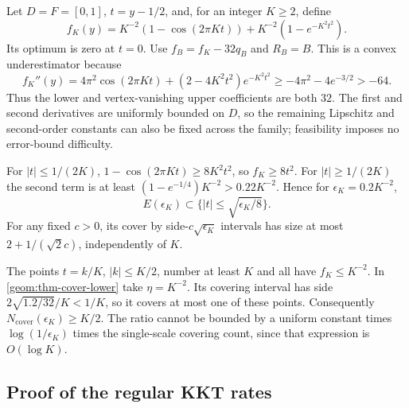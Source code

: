 \begin{example}\label{app:geometry:ex-wells}
Let $D=F=[0,1]$, $t=y-1/2$, and, for an integer $K\geq2$, define
\[
 f_K(y)=K^{-2}(1-\cos(2\pi Kt))
                  +K^{-2}(1-e^{-K^2t^2}).
\]
Its optimum is zero at $t=0$. Use
$f_B=f_K-32q_B$ and $R_B=B$. This is a convex underestimator because
\[
 f_K''(y)=4\pi^2\cos(2\pi Kt)+(2-4K^2t^2)e^{-K^2t^2}
                         \geq-4\pi^2-4e^{-3/2}>-64.
\]
Thus the lower and vertex-vanishing upper coefficients are both $32$.
The first and second derivatives are uniformly bounded on $D$, so the
remaining Lipschitz and second-order constants can also be fixed across
the family; feasibility imposes no error-bound difficulty.

For $|t|\leq1/(2K)$, $1-\cos(2\pi Kt)\geq8K^2t^2$, so
$f_K\geq8t^2$. For $|t|\geq1/(2K)$ the second term is at least
$(1-e^{-1/4})K^{-2}>0.22K^{-2}$. Hence for
$\epsilon_K=0.2K^{-2}$,
\[
 E(\epsilon_K)\subset
           \{|t|\leq\sqrt{\epsilon_K/8}\}.
\]
For any fixed $c>0$, its cover by side-$c\sqrt{\epsilon_K}$ intervals
has size at most $2+1/(\sqrt2c)$, independently of $K$.

The points $t=k/K$, $|k|\leq K/2$, number at least $K$ and all have
$f_K\leq K^{-2}$. In \cref{geom:thm-cover-lower} take
$\eta=K^{-2}$. Its covering interval has side
$2\sqrt{1.2/32}/K<1/K$, so it covers at most one of these points.
Consequently $N_{\mathrm{cover}}(\epsilon_K)\geq K/2$.
The ratio cannot be bounded by a uniform constant times
$\log(1/\epsilon_K)$ times the single-scale covering count, since that
expression is $O(\log K)$.
\end{example}

\subsection{Proof of the regular KKT rates}
\label{app:geometry:proof-kkt-rates}

